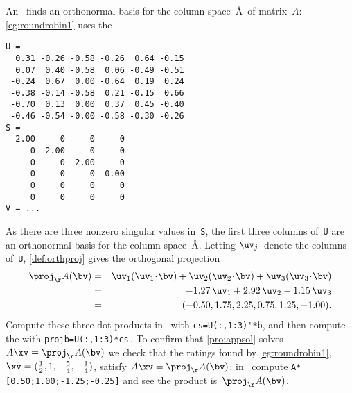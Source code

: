 \begin{example}
An \svd\ finds an orthonormal basis for the column space~\AA\ of matrix~\(A\): \autoref{eg:roundrobin1} uses the \svd\ \twodp
\setbox\ajrqrbox\hbox{}%
\marginajrbox%
\begin{verbatim}
U =
  0.31 -0.26 -0.58 -0.26  0.64 -0.15
  0.07  0.40 -0.58  0.06 -0.49 -0.51
 -0.24  0.67  0.00 -0.64  0.19  0.24
 -0.38 -0.14 -0.58  0.21 -0.15  0.66
 -0.70  0.13  0.00  0.37  0.45 -0.40
 -0.46 -0.54 -0.00 -0.58 -0.30 -0.26
S =
  2.00     0     0     0
     0  2.00     0     0
     0     0  2.00     0
     0     0     0  0.00
     0     0     0     0
     0     0     0     0
V = ...
\end{verbatim}
As there are three nonzero singular values in~\verb|S|, the first three columns of~\verb|U| are an orthonormal basis for the column space~\AA.
Letting \(\uv_j\)~denote the columns of~\verb|U|, \autoref{def:orthproj} gives the orthogonal projection \twodp
\begin{eqnarray*}
\proj_\AA(\bv)
&=&\uv_1(\uv_1\cdot\bv)+\uv_2(\uv_2\cdot\bv)+\uv_3(\uv_3\cdot\bv)
\\&=&-1.27\,\uv_1+2.92\,\uv_2-1.15\,\uv_3
\\&=&(-0.50,1.75,2.25,0.75,1.25,-1.00).
\end{eqnarray*}
Compute these three dot products in \script\ with \verb|cs=U(:,1:3)'*b|, and then compute the  with \verb|projb=U(:,1:3)*cs|\,.
To confirm that \autoref{pro:appsol} solves \(A\xv=\proj_\AA(\bv)\) we check that the ratings found by \autoref{eg:roundrobin1}, \(\xv=(\frac12,1,-\frac54,-\frac14)\), satisfy \(A\xv=\proj_\AA(\bv)\): in \script\ compute \verb|A*[0.50;1.00;-1.25;-0.25]| and see the product is~\(\proj_\AA(\bv)\).
\end{example}


